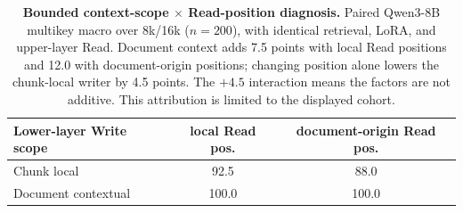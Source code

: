 \begin{table}[!t]
\centering
\scriptsize
\setlength{\tabcolsep}{3pt}
\begin{tabular}{@{}lcc@{}}
\toprule
\textbf{Lower-layer Write scope} & \textbf{local Read pos.} &
\textbf{document-origin Read pos.} \\
\midrule
Chunk local & 92.5 & 88.0 \\
Document contextual & 100.0 & 100.0 \\
\bottomrule
\end{tabular}
\caption{\textbf{Bounded context-scope $\times$ Read-position diagnosis.}
Paired Qwen3-8B multikey macro over 8k/16k ($n{=}200$), with identical
retrieval, LoRA, and upper-layer Read. Document context adds 7.5 points with
local Read positions and 12.0 with document-origin positions; changing position
alone lowers the chunk-local writer by 4.5 points. The $+4.5$ interaction means
the factors are not additive. This attribution is limited to the displayed
cohort.}
\label{tab:context-position}
\end{table}
